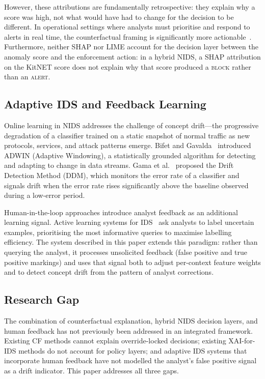 \documentclass[preprint,12pt,authoryear]{elsarticle}
\begin{document}
However, these attributions are fundamentally retrospective: they explain why a
score was high, not what would have had to change for the decision to be
different. In operational settings where analysts must prioritise and respond to
alerts in real time, the counterfactual framing is significantly more
actionable~\citep{Wachter2018}. Furthermore, neither SHAP nor LIME account for
the decision layer between the anomaly score and the enforcement action: in a
hybrid NIDS, a SHAP attribution on the KitNET score does not explain why that
score produced a \textsc{block} rather than an \textsc{alert}.

\subsection{Adaptive IDS and Feedback Learning}
\label{subsec:adaptive_ids}

Online learning in NIDS addresses the challenge of concept drift---the
progressive degradation of a classifier trained on a static snapshot of normal
traffic as new protocols, services, and attack patterns emerge. Bifet and
Gavalda~\citep{Bifet2007} introduced ADWIN (Adaptive Windowing), a statistically
grounded algorithm for detecting and adapting to change in data streams.
Gama et al.~\citep{Gama2004} proposed the Drift Detection Method (DDM), which
monitors the error rate of a classifier and signals drift when the error rate
rises significantly above the baseline observed during a low-error period.

Human-in-the-loop approaches introduce analyst feedback as an additional
learning signal. Active learning systems for IDS~\citep{Miller2020} ask analysts
to label uncertain examples, prioritising the most informative queries to
maximise labelling efficiency. The system described in this paper extends this
paradigm: rather than querying the analyst, it processes unsolicited feedback
(false positive and true positive markings) and uses that signal both to adjust
per-context feature weights and to detect concept drift from the pattern of
analyst corrections.

\subsection{Research Gap}
\label{subsec:gap}

The combination of counterfactual explanation, hybrid NIDS decision layers, and
human feedback has not previously been addressed in an integrated framework.
Existing CF methods cannot explain override-locked decisions; existing
XAI-for-IDS methods do not account for policy layers; and adaptive IDS systems
that incorporate human feedback have not modelled the analyst's false positive
signal as a drift indicator. This paper addresses all three gaps.
\end{document}
